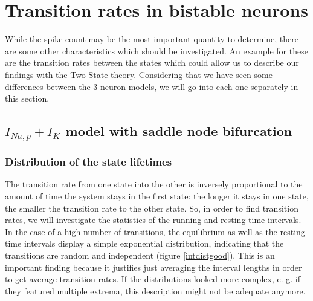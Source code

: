 \documentclass[12pt,a4paper]{article}
\begin{document}
\section{Transition rates in bistable neurons}
While the spike count may be the most important quantity to determine, there are some other characteristics which should be investigated. An example for these are the transition rates between the states which could allow us to describe our findings with the Two-State theory. Considering that we have seen some differences between the 3 neuron models, we will go into each one separately in this section. 
\subsection{$I_{Na,p}+I_K$ model with saddle node bifurcation}
\subsubsection{Distribution of the state lifetimes}
The transition rate from one state into the other is inversely proportional to the amount of time the system stays in the first state: the longer it stays in one state, the smaller the transition rate to the other state. So, in order to find transition rates, we will investigate the statistics of the running and resting time intervals.\\
In the case of a high number of transitions, the equilibrium as well as the resting time intervals display a simple exponential distribution, indicating that the transitions are random and independent (figure \ref{intdistgood}). This is an important finding because it justifies just averaging the interval lengths in order to get average transition rates. If the distributions looked more complex, e. g. if they featured multiple extrema, this description might not be adequate anymore.
\end{document}
